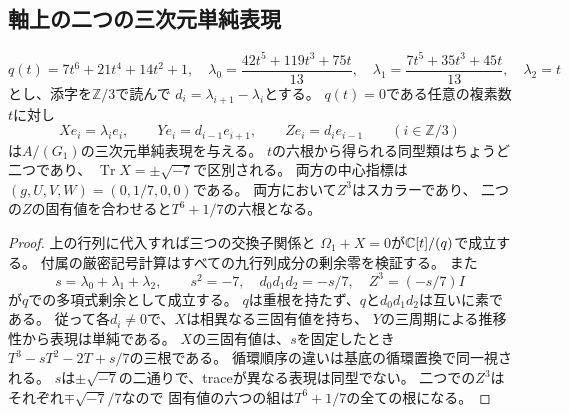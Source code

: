 \subsection{軸上の二つの三次元単純表現}
\begin{proposition}[六次多項式による明示表現]
\label{prop:local-two-axial}
\[
 q(t)=7t^6+21t^4+14t^2+1,\quad
 \lambda_0=\frac{42t^5+119t^3+75t}{13},\quad
 \lambda_1=\frac{7t^5+35t^3+45t}{13},\quad
 \lambda_2=t
\]
とし、添字を$\mathbb Z/3$で読んで
$d_i=\lambda_{i+1}-\lambda_i$とする。
$q(t)=0$である任意の複素数$t$に対し
\[
 Xe_i=\lambda_i e_i,\qquad
 Ye_i=d_{i-1}e_{i+1},\qquad
 Ze_i=d_ie_{i-1}\qquad(i\in\mathbb Z/3)
\]
は$A/(G_1)$の三次元単純表現を与える。
$t$の六根から得られる同型類はちょうど二つであり、
$\operatorname{Tr}X=\pm\sqrt{-7}$で区別される。
両方の中心指標は$(g,U,V,W)=(0,1/7,0,0)$である。
両方において$Z^3$はスカラーであり、
二つの$Z$の固有値を合わせると$T^6+1/7$の六根となる。
\end{proposition}
\begin{proof}
上の行列に代入すれば三つの交換子関係と
$\Omega_1+X=0$が$\mathbb C[t]/(q)$で成立する。
付属の厳密記号計算はすべての九行列成分の剰余零を検証する。
また
\[
 s=\lambda_0+\lambda_1+\lambda_2,\qquad
 s^2=-7,\quad
 d_0d_1d_2=-s/7,\quad
 Z^3=(-s/7)I
\]
が$q$での多項式剰余として成立する。
$q$は重根を持たず、$q$と$d_0d_1d_2$は互いに素である。
従って各$d_i\ne0$で、$X$は相異なる三固有値を持ち、
$Y$の三周期による推移性から表現は単純である。
$X$の三固有値は、$s$を固定したとき
$T^3-sT^2-2T+s/7$の三根である。
循環順序の違いは基底の循環置換で同一視される。
$s$は$\pm\sqrt{-7}$の二通りで、traceが異なる表現は同型でない。
二つでの$Z^3$はそれぞれ$\mp\sqrt{-7}/7$なので
固有値の六つの組は$T^6+1/7$の全ての根になる。
\end{proof}

